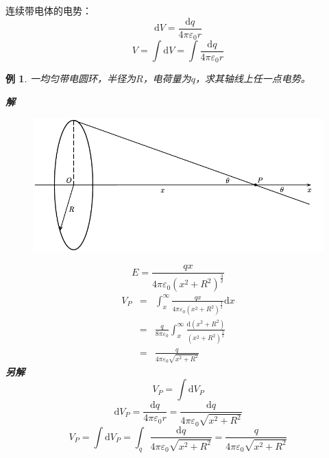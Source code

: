 \documentclass[12pt, a4paper, twoside]{ctexbook}
\newtheorem{example}[theorem]{例}
\begin{document}
{\sonti 连续带电体的电势}：
$$
\mathrm{d}V=\frac{\mathrm{d}q}{4\pi\varepsilon_0r}
$$
$$
V=\int\mathrm{d}V=\int\frac{\mathrm{d}q}{4\pi\varepsilon_0r}
$$
\begin{example}
    一均匀带电圆环，半径为$R$，电荷量为$q$，求其轴线上任一点电势。
    
    \noindent\textbf{解}
    \begin{figure}[H]
        \centerline{\includegraphics[scale=1.0]{CH09EX04.pdf}}
    \end{figure}
    $$
    E=\frac{qx}{4\pi\varepsilon_0\left(x^2+R^2\right)^{\frac{3}{2}}}
    $$
    \begin{eqnarray}
    V_P &=&\int_{x}^{\infty}\frac{qx}{4\pi\varepsilon_0\left(x^2+R^2\right)^{\frac{3}{2}}}\mathrm{d}x \nonumber \\
    ~&=&\frac{q}{8\pi\varepsilon_0}\int_{x}^{\infty}\frac{\mathrm{d}\left(x^2+R^2\right)}{\left(x^2+R^2\right)^{\frac{3}{2}}} \nonumber \\
    ~&=&\frac{q}{4\pi\varepsilon_0\sqrt{x^2+R^2}} \nonumber
    \end{eqnarray}
    \noindent\textbf{另解}
    $$
    V_P=\int\mathrm{d}V_P
    $$
    $$
    \mathrm{d}V_P=\frac{\mathrm{d}q}{4\pi\varepsilon_0r}=\frac{\mathrm{d}q}{4\pi\varepsilon_0\sqrt{x^2+R^2}}
    $$
    $$
    V_P=\int\mathrm{d}V_P=\int_q\frac{\mathrm{d}q}{4\pi\varepsilon_0\sqrt{x^2+R^2}}=\frac{q}{4\pi\varepsilon_0\sqrt{x^2+R^2}}
    $$
\end{example}
\end{document}
